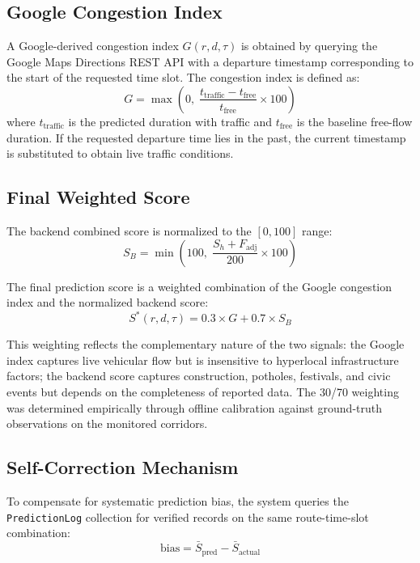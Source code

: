 \documentclass[conference]{IEEEtran}
\begin{document}
\subsection{Google Congestion Index}

A Google-derived congestion index $G(r, d, \tau)$ is obtained by querying the Google Maps Directions REST API with a departure timestamp corresponding to the start of the requested time slot. The congestion index is defined as:
\begin{equation}
G = \max\!\left(0,\; \frac{t_{\text{traffic}} - t_{\text{free}}}{t_{\text{free}}} \times 100\right)
\label{eq:google}
\end{equation}
where $t_{\text{traffic}}$ is the predicted duration with traffic and $t_{\text{free}}$ is the baseline free-flow duration. If the requested departure time lies in the past, the current timestamp is substituted to obtain live traffic conditions.

\subsection{Final Weighted Score}

The backend combined score is normalized to the $[0, 100]$ range:
\begin{equation}
S_B = \min\!\left(100,\; \frac{S_h + F_{\text{adj}}}{200} \times 100\right)
\label{eq:backend}
\end{equation}

The final prediction score is a weighted combination of the Google congestion index and the normalized backend score:
\begin{equation}
S^*(r, d, \tau) = 0.3 \times G + 0.7 \times S_B
\label{eq:final}
\end{equation}

This weighting reflects the complementary nature of the two signals: the Google index captures live vehicular flow but is insensitive to hyperlocal infrastructure factors; the backend score captures construction, potholes, festivals, and civic events but depends on the completeness of reported data. The 30/70 weighting was determined empirically through offline calibration against ground-truth observations on the monitored corridors.

\subsection{Self-Correction Mechanism}

To compensate for systematic prediction bias, the system queries the \texttt{PredictionLog} collection for verified records on the same route-time-slot combination:
\begin{equation}
\text{bias} = \bar{S}_{\text{pred}} - \bar{S}_{\text{actual}}
\label{eq:bias}
\end{equation}
\end{document}
